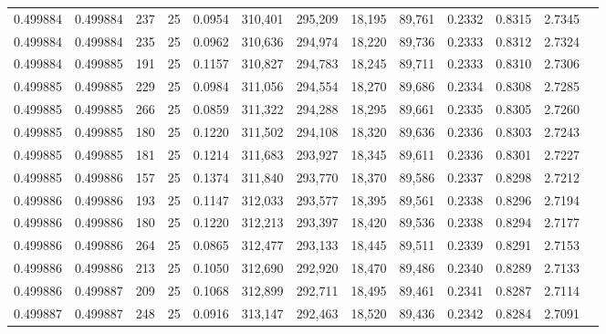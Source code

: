 \begin{tabular}{rrrrrrrrrrrrr}
0.499884 & 0.499884 &   237 &  25 &                                     0.0954 & 310,401 & 295,209 &  18,195 &  89,761 & 0.2332 & 0.8315 & 2.7345 \\
0.499884 & 0.499884 &   235 &  25 &                                     0.0962 & 310,636 & 294,974 &  18,220 &  89,736 & 0.2333 & 0.8312 & 2.7324 \\
0.499884 & 0.499885 &   191 &  25 &                                     0.1157 & 310,827 & 294,783 &  18,245 &  89,711 & 0.2333 & 0.8310 & 2.7306 \\
0.499885 & 0.499885 &   229 &  25 &                                     0.0984 & 311,056 & 294,554 &  18,270 &  89,686 & 0.2334 & 0.8308 & 2.7285 \\
0.499885 & 0.499885 &   266 &  25 &                                     0.0859 & 311,322 & 294,288 &  18,295 &  89,661 & 0.2335 & 0.8305 & 2.7260 \\
0.499885 & 0.499885 &   180 &  25 &                                     0.1220 & 311,502 & 294,108 &  18,320 &  89,636 & 0.2336 & 0.8303 & 2.7243 \\
0.499885 & 0.499885 &   181 &  25 &                                     0.1214 & 311,683 & 293,927 &  18,345 &  89,611 & 0.2336 & 0.8301 & 2.7227 \\
0.499885 & 0.499886 &   157 &  25 &                                     0.1374 & 311,840 & 293,770 &  18,370 &  89,586 & 0.2337 & 0.8298 & 2.7212 \\
0.499886 & 0.499886 &   193 &  25 &                                     0.1147 & 312,033 & 293,577 &  18,395 &  89,561 & 0.2338 & 0.8296 & 2.7194 \\
0.499886 & 0.499886 &   180 &  25 &                                     0.1220 & 312,213 & 293,397 &  18,420 &  89,536 & 0.2338 & 0.8294 & 2.7177 \\
0.499886 & 0.499886 &   264 &  25 &                                     0.0865 & 312,477 & 293,133 &  18,445 &  89,511 & 0.2339 & 0.8291 & 2.7153 \\
0.499886 & 0.499886 &   213 &  25 &                                     0.1050 & 312,690 & 292,920 &  18,470 &  89,486 & 0.2340 & 0.8289 & 2.7133 \\
0.499886 & 0.499887 &   209 &  25 &                                     0.1068 & 312,899 & 292,711 &  18,495 &  89,461 & 0.2341 & 0.8287 & 2.7114 \\
0.499887 & 0.499887 &   248 &  25 &                                     0.0916 & 313,147 & 292,463 &  18,520 &  89,436 & 0.2342 & 0.8284 & 2.7091 \\

\end{tabular}

